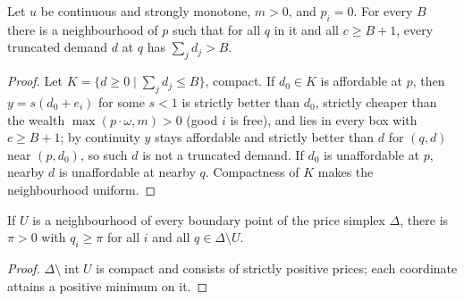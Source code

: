 \begin{lemma}
\label{lem:boundary_uniform}
\leanok
{}
Let $u$ be continuous and strongly monotone, $m > 0$, and $p_i = 0$. For every $B$ there is a neighbourhood of $p$ such
that for all $q$ in it and all $c \ge B + 1$, every truncated demand $d$ at $q$ has $\sum_j d_j > B$.
\end{lemma}
\begin{proof}
\leanok
Let $K = \{d \ge 0 \mid \sum_j d_j \le B\}$, compact. If $d_0 \in K$ is affordable at $p$, then $y = s(d_0 + e_i)$ for some
$s < 1$ is strictly better than $d_0$, strictly cheaper than the wealth $\max(p\cdot\omega, m) > 0$ (good $i$ is free), and
lies in every box with $c \ge B + 1$; by continuity $y$ stays affordable and strictly better than $d$ for $(q, d)$ near
$(p, d_0)$, so such $d$ is not a truncated demand. If $d_0$ is unaffordable at $p$, nearby $d$ is unaffordable at nearby
$q$. Compactness of $K$ makes the neighbourhood uniform.
\end{proof}

\begin{lemma}
\label{lem:price_floor}
\leanok
If $U$ is a neighbourhood of every boundary point of the price simplex $\Delta$, there is $\pi > 0$ with $q_i \ge \pi$ for
all $i$ and all $q \in \Delta \setminus U$.
\end{lemma}
\begin{proof}
\leanok
$\Delta \setminus \operatorname{int} U$ is compact and consists of strictly positive prices; each coordinate attains a
positive minimum on it.
\end{proof}

